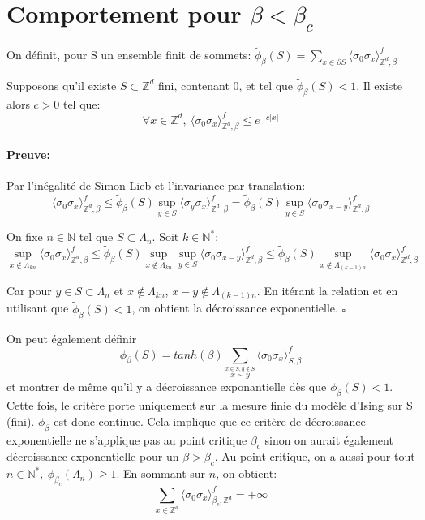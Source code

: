 \documentclass[a4paper,12pt]{report}
\newenvironment{preuve}{\paragraph{Preuve:}}{\hfill$\square$}
\begin{document}
\section{Comportement pour $\beta < \beta_c$}

On définit, pour S un ensemble finit de sommets: $\tilde{\phi}_{\beta}(S) = \sum_{x \in \partial S} \langle \sigma_0 \sigma_x \rangle_{\mathbb{Z}^d,\beta}^f$

\begin{lemme}
Supposons qu'il existe $S \subset \mathbb{Z}^d$ fini, contenant $0$, et tel que $\tilde{\phi}_{\beta}(S)<1$. Il existe alors $c > 0$ tel que:
$$
\forall x \in \mathbb{Z}^d, \ \langle \sigma_0 \sigma_x \rangle_{\mathbb{Z}^d,\beta}^f \leq e^{-c\vert x \vert}
$$
\end{lemme}

\begin{preuve}
Par l'inégalité de Simon-Lieb et l'invariance par translation: 
$$\langle \sigma_0 \sigma_x \rangle_{\mathbb{Z}^d,\beta}^f 
\leq \tilde{\phi}_{\beta}(S) \sup_{y \in S} \langle \sigma_y \sigma_x \rangle_{\mathbb{Z}^d,\beta}^f 
= \tilde{\phi}_{\beta}(S) \sup_{y \in S} \langle \sigma_0 \sigma_{x-y} \rangle_{\mathbb{Z}^d,\beta}^f$$

On fixe $n \in \mathbb{N}$ tel que $S \subset \Lambda_n$. Soit $k \in \mathbb{N}^*$:
$$
\sup_{x \notin \Lambda_{kn}} \langle \sigma_0 \sigma_x \rangle_{\mathbb{Z}^d,\beta}^f 
\leq \tilde{\phi}_{\beta}(S) \sup_{x \notin \Lambda_{kn}} \sup_{y \in S} \langle \sigma_0 \sigma_{x-y} \rangle_{\mathbb{Z}^d,\beta}^f
\leq \tilde{\phi}_{\beta}(S) \sup_{x \notin \Lambda_{(k-1)n}} \langle \sigma_0 \sigma_{x} \rangle_{\mathbb{Z}^d,\beta}^f$$

Car pour $y \in S \subset \Lambda_n$ et $x \notin \Lambda_{kn}$, $x-y \notin \Lambda_{(k-1)n}$. En itérant la relation et en utilisant que $\tilde{\phi}_{\beta}(S)<1$, on obtient la décroissance exponentielle.
\end{preuve}

On peut également définir
$$\phi_{\beta}(S) = tanh(\beta) \sum_{\overset{x\in S, y \notin S}{x \sim y}} \langle \sigma_0 \sigma_x \rangle^f_{S,\beta}$$
et montrer de même qu'il y a décroissance exponantielle dès que $\phi_{\beta}(S) <1$. Cette fois, le critère porte uniquement sur la mesure finie du modèle d'Ising sur S (fini). $\phi_{\beta}$ est donc continue. Cela implique que ce critère de décroissance exponentielle ne s'applique pas au point critique $\beta_c$ sinon on aurait également décroissance exponentielle pour un $\beta > \beta_c$. Au point critique, on a aussi pour tout $n \in \mathbb{N}^*, \ \phi_{\beta_c}(\Lambda_n) \geq 1$. En sommant sur $n$, on obtient:
$$
\sum_{x \in \mathbb{Z}^d} \langle \sigma_0 \sigma_x \rangle^f_{\beta_c, \mathbb{Z}^d} = + \infty
$$
\end{document}
